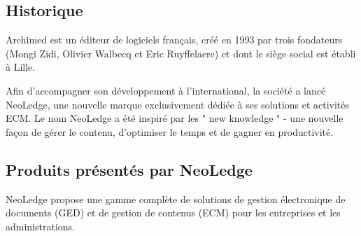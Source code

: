 \subsection{Historique}

Archimed\cite{archimed} est un éditeur de logiciels français, créé en 1993 par trois fondateurs (Mongi Zidi, Olivier Walbecq et Eric Ruyffelaere) et dont le siège social est établi à Lille.
\medskip

Afin d'accompagner son développement à l'international, la société a lancé NeoLedge, une nouvelle marque exclusivement dédiée à ses solutions et activités ECM. Le nom NeoLedge a été inspiré par les " new knowledge " - une nouvelle façon de gérer le contenu, d'optimiser le temps et de gagner en productivité.


\subsection{Produits présentés par NeoLedge }
NeoLedge propose une gamme complète de solutions de gestion électronique de documents (GED) et de gestion de contenus (ECM) pour les entreprises et les administrations.

